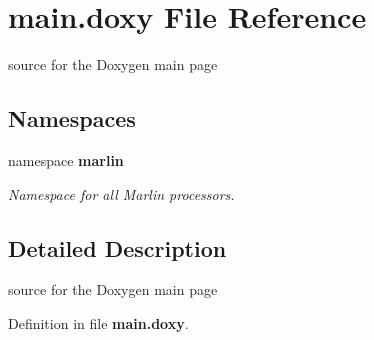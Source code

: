 \section{main.doxy File Reference}
\label{main_8doxy}


source for the Doxygen main page  
\subsection*{Namespaces}
\begin{DoxyCompactItemize}
\item 
namespace {\bf marlin}


\begin{DoxyCompactList}\small\item\em Namespace for all Marlin processors. \item\end{DoxyCompactList}\end{DoxyCompactItemize}


\subsection{Detailed Description}
source for the Doxygen main page 

Definition in file {\bf main.doxy}.